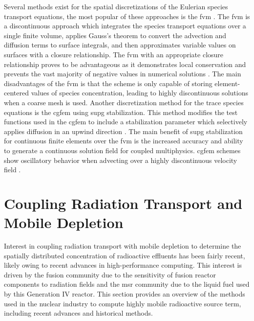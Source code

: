 Several methods exist for the spatial discretizations of the Eulerian species transport equations, the most popular of these approaches is the \acrshort{fvm} \cite{finite_volume_methods,moose_ns_crab}. The \acrshort{fvm} is a discontinuous approach which integrates the species transport equations over a single finite volume, applies Gauss's theorem to convert the advection and diffusion terms to surface integrals, and then approximates variable values on surfaces with a closure relationship. The \acrshort{fvm} with an appropriate closure relationship proves to be advantageous as it demonstrates local conservation and prevents the vast majority of negative values in numerical solutions \cite{finite_volume_methods,moose_ns_crab}. The main disadvantages of the \acrshort{fvm} is that the scheme is only capable of storing element-centered values of species concentration, leading to highly discontinuous solutions when a coarse mesh is used. Another discretization method for the trace species equations is the \acrshort{cgfem} using \acrshort{supg} stabilization. This method modifies the test functions used in the \acrshort{cgfem} to include a stabilization parameter which selectively applies diffusion in an upwind direction \cite{ns_supg, ad_diff_supg}. The main benefit of \acrshort{supg} stabilization for continuous finite elements over the \acrshort{fvm} is the increased accuracy and ability to generate a continuous solution field for coupled multiphysics. \acrshort{cgfem} schemes show oscillatory behavior when advecting over a highly discontinuous velocity field \cite{moose_ns_cgfem}. 

\section{Coupling Radiation Transport and Mobile Depletion}
\label{lit_review:multiphysics}

Interest in coupling radiation transport with mobile depletion to determine the spatially distributed concentration of radioactive effluents has been fairly recent, likely owing to recent advances in high-performance computing. This interest is driven by the fusion community due to the sensitivity of fusion reactor components to radiation fields \cite{fusion_activation_wall,fusion_activation_tool_fluned,fusion_activation_demo_wcll,fusion_activation_modelling} and the \acrshort{msr} community due to the liquid fuel \cite{scale_msr,griffin_pronghorn_msr_init,griffin_pronghorn_msr} used by this Generation IV reactor. This section provides an overview of the methods used in the nuclear industry to compute highly mobile radioactive source term, including recent advances and historical methods.

